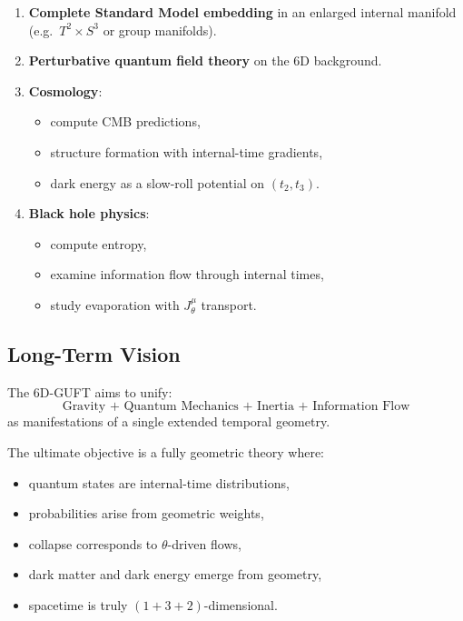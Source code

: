 \documentclass[12pt]{article}
\begin{document}
\begin{enumerate}
\item \textbf{Complete Standard Model embedding} in an enlarged internal
manifold (e.g.\ \(T^2\times S^3\) or group manifolds).

\item \textbf{Perturbative quantum field theory} on the 6D background.

\item \textbf{Cosmology}:
\begin{itemize}
\item compute CMB predictions,
\item structure formation with internal-time gradients,
\item dark energy as a slow-roll potential on \((t_2,t_3)\).
\end{itemize}

\item \textbf{Black hole physics}:
\begin{itemize}
\item compute entropy,
\item examine information flow through internal times,
\item study evaporation with \(J_\theta^\mu\) transport.
\end{itemize}
\end{enumerate}

\subsection{Long-Term Vision}

The 6D-GUFT aims to unify:
\[
\text{Gravity + Quantum Mechanics + Inertia + Information Flow}
\]
as manifestations of a single extended temporal geometry.

The ultimate objective is a fully geometric theory where:
\begin{itemize}
\item quantum states are internal-time distributions,
\item probabilities arise from geometric weights,
\item collapse corresponds to \(\theta\)-driven flows,
\item dark matter and dark energy emerge from geometry,
\item spacetime is truly \((1+3+2)\)-dimensional.
\end{itemize}

\end{document}
